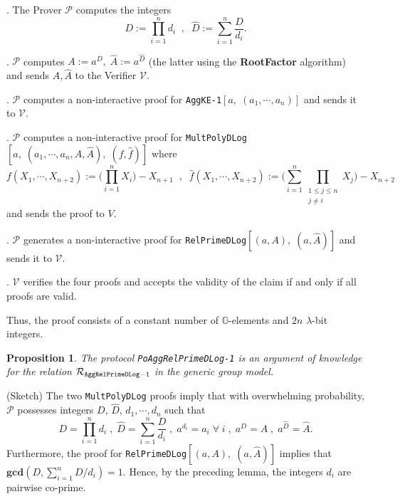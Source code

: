 \documentclass[11pt, lettersize, notitlepage, leqno, footskip=0.6cm]{article}
\newcommand{\pl}{\prod\limits}
\newcommand{\slim}{\sum\limits}
\newcommand{\mc}{\mathcal}
\newcommand{\mb}{\mathbb}
\newcommand{\mbf}{\mathbf}
\newcommand{\lam}{\lambda}
\newcommand{\what}{\widehat}
\newcommand{\mP}{\mc{P}}
\newcommand{\V}{\mc{V}}
\newcommand{\vs}{\vspace{-0.15cm}}
\newcommand{\noin}{\noindent}
\newcommand{\op}{overwhelming probability}
\newcommand{\GCD}{\mbf{gcd}}
\newtheorem{Prop}[Thm]{Proposition}
\numberwithin{equation}{section}
\begin{document}
\begin{prf1}. The Prover $\mP$ computes the integers \vs $$D:=\pl_{i=1}^n d_i\;\;,\;\; \what{D}:= \slim_{i=1}^n \frac{D}{d_i}.$$

\noin 2. $\mP$ computes $A:= a^D,\;\what{A}:= a^{\what{D}} $ (the latter using the \textbf{RootFactor} algorithm) and sends $A,\what{A}$ to the Verifier $\V$.

\noin 3. $\mP$ computes a non-interactive proof for \verb|AggKE-1|$[a,\;(a_1,\cdots,a_n)]$ and sends it to $\V$.

\noin 4. $\mP$ computes a non-interactive proof for \verb|MultPolyDLog|$[a,\;(a_1,\cdots,a_n,A, \what{A}),\; (f,\what{f})]$ where \vs $$f(X_1,\cdots,X_{n+2}):= \big(\pl_{i=1}^n X_i\big) -X_{n+1}\;\;,\;\;\what{f}(X_1,\cdots, X_{n+2}):= \big(\slim_{i=1}^n \pl_{\substack{1\leq j\leq n \\ j\neq i}} X_j\big) - X_{n+2}$$ and sends the proof to $V$.

\begin{comment}

\noin 5. $\mP$ generates a non-interactive proof for \verb|MultPolyDLog|$[a,\;(a_1,\cdots,a_n,\what{A}),\; \what{f}]$ where \vs $$\what{f}(X_1,\cdots, X_{n+1}):= \big(\slim_{i=1}^n \pl_{\substack{1\leq j\leq n \\ j\neq i}} X_j\big) - X_{n+1}$$ and sends the proof to $\V$.\end{comment}

\noin 5. $\mP$ generates a non-interactive proof for \verb|RelPrimeDLog|$[(a,A),\;(a,\what{A})]$ and sends it to $\V$.

\noin 6. $\V$ verifies the four proofs and accepts the validity of the claim if and only if all proofs are valid.\end{prf1}

\noin Thus, the proof consists of a constant number of $\mb{G}$-elements and $2n$ $\lam$-bit integers.

\begin{Prop} The protocol \verb|PoAggRelPrimeDLog-1| is an argument of knowledge for the relation $\mc{R}_{\tt{AggRelPrimeDLog-1}}$ in the generic group model.\end{Prop}

\begin{prf} (Sketch) The two \verb|MultPolyDLog| proofs imply that with \op, $\mP$ possesses integers $D$, $\what{D}$, $d_1,\cdots,d_n$ such that \vs $$D = \pl_{i=1}^n d_i\;,\;\what{D} = \slim_{i=1}^n \frac{D}{d_i}   \;,\;a^{d_i} = a_i\;\forall\;i \;,\;a^{D} = A\;,\; a^{\what{D}} = \what{A} .$$ Furthermore, the proof for \verb|RelPrimeDLog|$[(a,A),\;(a,\what{A})]$ implies that $\GCD(D,\slim_{i=1}^n D/d_i) = 1$. Hence, by the preceding lemma, the integers $d_i$ are pairwise co-prime.\end{prf}
\end{document}
